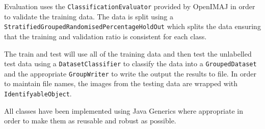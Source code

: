 \documentclass[paper=a4, fontsize=11pt]{article}
\begin{document}
Evaluation uses the \texttt{ClassificationEvaluator} provided by OpenIMAJ in order to validate the training data. The data is split using a \texttt{StratifiedGroupedRandomisedPercentageHoldOut} which splits the data ensuring that the training and validation ratio is consistent for each class.

The train and test will use all of the training data and then test the unlabelled test data using a \texttt{DatasetClassifier} to classify the data into a \texttt{GroupedDataset} and the appropriate \texttt{GroupWriter} to write the output the results to file. In order to maintain file names, the images from the testing data are wrapped with \texttt{IdentifyableObject}.

All classes have been implemented using Java Generics where appropriate in order to make them as reusable and robust as possible.
\end{document}
